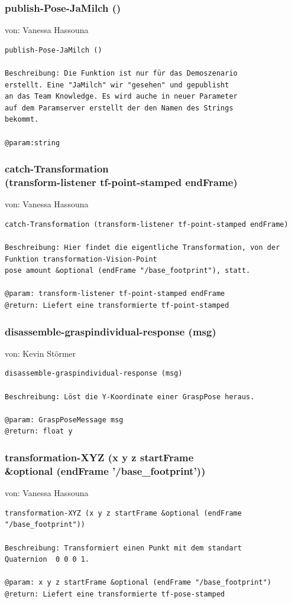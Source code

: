 \documentclass{suturo}
\makeatletter
\newcommand{\chapterauthor}[1]{%
  {\parindent0pt\vspace*{-27pt}%
  \linespread{0}\small\begin{flushright}von: #1\end{flushright}%
  \par\nobreak\vspace*{0pt}}
  \@afterheading%
}
\makeatother
\begin{document}
\subsubsection{publish-Pose-JaMilch ()}
\chapterauthor{Vanessa Hassouna}
\begin{verbatim}
publish-Pose-JaMilch ()

Beschreibung: Die Funktion ist nur für das Demoszenario 
erstellt. Eine "JaMilch" wir "gesehen" und gepublisht
an das Team Knowledge. Es wird auche in neuer Parameter
auf dem Paramserver erstellt der den Namen des Strings
bekommt.

@param:string
\end{verbatim}



\subsubsection{catch-Transformation \\
(transform-listener tf-point-stamped endFrame)}
\chapterauthor{Vanessa Hassouna}
\begin{verbatim}
catch-Transformation (transform-listener tf-point-stamped endFrame)

Beschreibung: Hier findet die eigentliche Transformation, von der
Funktion transformation-Vision-Point 
pose amount &optional (endFrame "/base_footprint"), statt.

@param: transform-listener tf-point-stamped endFrame
@return: Liefert eine transformierte tf-point-stamped
\end{verbatim}

\subsubsection{disassemble-graspindividual-response (msg)}
\chapterauthor{Kevin Störmer}
\begin{verbatim}
disassemble-graspindividual-response (msg)

Beschreibung: Löst die Y-Koordinate einer GraspPose heraus.

@param: GraspPoseMessage msg
@return: float y
\end{verbatim}


\subsubsection{transformation-XYZ (x y z startFrame\\
\&optional (endFrame '/base\_footprint'))}
\chapterauthor{Vanessa Hassouna}
\begin{verbatim}
transformation-XYZ (x y z startFrame &optional (endFrame "/base_footprint"))

Beschreibung: Transformiert einen Punkt mit dem standart
Quaternion  0 0 0 1.

@param: x y z startFrame &optional (endFrame "/base_footprint")
@return: Liefert eine transformierte tf-pose-stamped
\end{verbatim}
\end{document}
